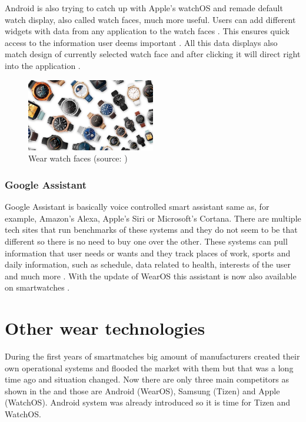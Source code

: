 Android is also trying to catch up with Apple's watchOS and remade default watch display, also called watch faces, much more useful. Users can add different widgets with data from any application to the watch faces \cite{AW2UG}. This ensures quick access to the information user deems important \cite{AW2N}. All this data displays also match design of currently selected watch face and after clicking it will direct right into the application \cite{AW2WN}.

\begin{figure}[H]
	\begin{centering}
		\includegraphics[width=0.5\textwidth]{img/wear_watch_faces}
		\par\end{centering}
	\caption{Wear watch faces (source: \cite{AW2UG})\label{fig:WearWatchFaces}}
	\label{fig04c04}
\end{figure}

\subsubsection{Google Assistant}\label{sec:GoogleAssistant}
Google Assistant is basically voice controlled smart assistant same as, for example, Amazon's Alexa, Apple's Siri or Microsoft's Cortana. There are multiple tech sites that run benchmarks of these systems \cite{ASGA, VACCGASAB, CAGACS, GASBAC} and they do not seem to be that different so there is no need to buy one over the other. These systems can pull information that user needs or wants and they track places of work, sports and daily information, such as schedule, data related to health, interests of the user and much more \cite{WIGA}. With the update of WearOS this assistant is now also available on smartwatches \cite{AW2UG, AW2WN}.

\section{Other wear technologies}\label{sec:OtherWearTechnologies}
During the first years of smartmatches big amount of manufacturers created their own operational systems and flooded the market with them but that was a long time ago and situation changed. Now there are only three main competitors as shown in the  and those are Android (WearOS), Samsung (Tizen) and Apple (WatchOS). Android system was already introduced so it is time for Tizen and WatchOS.

